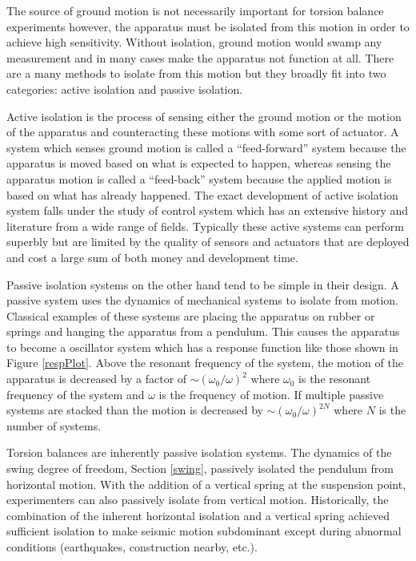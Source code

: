 \documentclass{book}
\begin{document}
The source of ground motion is not necessarily important for torsion balance experiments however, the apparatus must be isolated from this motion in order to achieve high sensitivity. Without isolation, ground motion would swamp any measurement and in many cases make the apparatus not function at all. There are a many methods to isolate from this motion but they broadly fit into two categories: active isolation and passive isolation. 

Active isolation is the process of sensing either the ground motion or the motion of the apparatus and counteracting these motions with some sort of actuator. A system which senses ground motion is called a ``feed-forward'' system because the apparatus is moved based on what is expected to happen, whereas sensing the apparatus motion is called a ``feed-back'' system because the applied motion is based on what has already happened. The exact development of active isolation system falls under the study of control system which has an extensive history and literature from a wide range of fields. Typically these active systems can perform superbly but are limited by the quality of sensors and actuators that are deployed and cost a large sum of both money and development time. 

Passive isolation systems on the other hand tend to be simple in their design. A passive system uses the dynamics of mechanical systems to isolate from motion. Classical examples of these systems are placing the apparatus on rubber or springs and hanging the apparatus from a pendulum. This causes the apparatus to become a oscillator system which has a response function like those shown in Figure \ref{respPlot}. Above the resonant frequency of the system, the motion of the apparatus is decreased by a factor of $\sim (\omega_0/\omega)^2$ where $\omega_0$ is the resonant frequency of the system and $\omega$ is the frequency of motion. If multiple passive systems are stacked than the motion is decreased by $\sim (\omega_0/\omega)^{2N}$ where $N$ is the number of systems.

Torsion balances are inherently passive isolation systems. The dynamics of the swing degree of freedom, Section \ref{swing}, passively isolated the pendulum from horizontal motion. With the addition of a vertical spring at the suspension point, experimenters can also passively isolate from vertical motion. Historically, the combination of the inherent horizontal isolation and a vertical spring achieved sufficient isolation to make seismic motion subdominant except during abnormal conditions (earthquakes, construction nearby, etc.). 
\end{document}

